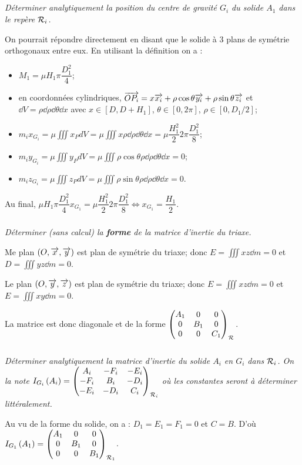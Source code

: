 \documentclass[10pt,fleqn]{article} %
\begin{document}
\begin{multicols}{2}
\subparagraph{}
\textit{Déterminer analytiquement la position du centre de gravité $G_i$ du solide $A_1$ dans le repère $\rep{i}$.}
\ifprof
\begin{corrige}
On pourrait répondre directement en disant que le solide à 3 plans de symétrie orthogonaux entre eux. 
En utilisant la définition on a :
\begin{itemize}
\item $M_1 =\mu H_1\pi \dfrac{D_1^2}{4}$;
\item en coordonnées cylindriques, $\vect{OP_i}=x\vect{x_i}+ \rho \cos\theta \vect{y_i}+\rho \sin\theta \vect{z_i}$ et $\dd V = \rho\dd \rho \dd \theta \dd x$ avec $x\in[D,D+H_1]$, $\theta\in [0,2\pi]$, $\rho \in \left[0,D_1/2\right]$;
\item $m_ix_{G_i}=\mu \iiint x_P dV = \mu \iiint x  \rho\dd \rho \dd \theta \dd x= \mu \dfrac{H_1^2}{2} 2\pi \dfrac{D_1^2}{8}$;
\item $m_iy_{G_i}=\mu \iiint y_P dV = \mu \iiint \rho \cos\theta   \rho\dd \rho \dd \theta \dd x=0$;
\item $m_iz_{G_i}=\mu \iiint z_P dV = \mu \iiint \rho \sin\theta  \rho\dd \rho \dd \theta \dd x=0$. 
\end{itemize}
Au final,  $\mu H_1\pi  \dfrac{D_1^2}{4}x_{G_1}=\mu \dfrac{H_1^2}{2}  2\pi  \dfrac{D_1^2}{8} \Leftrightarrow   x_{G_1}= \dfrac{H_1}{2}$.
\end{corrige}
\else
\fi



\subparagraph{}
\textit{Déterminer (sans calcul) la \textbf{forme} de la matrice d'inertie du triaxe.}
\ifprof
\begin{corrige}
Me plan $\left(O,\vect{x},\vect{y}\right)$ est plan de symétrie du triaxe; donc $E = \iiint xz \dd m = 0 $ et $D = \iiint yz \dd m = 0 $.

Le plan $\left(O,\vect{y},\vect{z}\right)$ est plan de symétrie du triaxe; donc $E = \iiint xz \dd m = 0 $ et $E = \iiint xy \dd m = 0 $.

La matrice est donc diagonale et de la forme $\matinertie{A_1}{B_1}{C_1}{0}{0}{0}{\rep{}}$.

\end{corrige}
\else
\fi

\subparagraph{}
\textit{Déterminer analytiquement la matrice d'inertie du solide $A_i$ en $G_
i$ dans $\rep{i}$. On la note $\inertie{G_i}{A_i}=\matinertie{A_i}{B_i}{C_i}{-D_i}{-E_i}{-F_i}{\rep{i}}$ où les constantes seront à déterminer littéralement.}
\ifprof
\begin{corrige}
Au vu de la forme du solide, on a : $D_1=E_1=F_1 = 0$ et $C=B$. D'où  $\inertie{G_1}{A_1}=\matinertie{A_1}{B_1}{B_1}{0}{0}{0}{\rep{1}}$.


\end{corrige}
\end{multicols}
\end{document}
